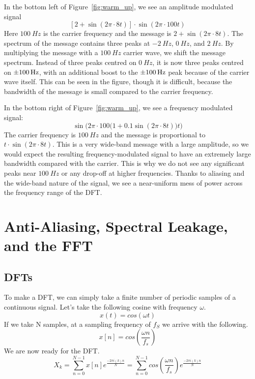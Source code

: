 \documentclass[twocolumn]{myarticle}
\begin{document}
In the bottom left of Figure~\ref{fig:warm_up}, we see an amplitude modulated signal
\[
    \left[ 2 + \sin(2\pi \cdot 8 t) \right] \cdot \sin ( 2 \pi \cdot 100 t)
\]
Here $ \SI{100}{Hz} $ is the carrier frequency and the message is $ 2 + \sin(2 \pi \cdot 8 t) $.
The spectrum of the message contains three peaks at $ \SI{-2}{Hz} $, $ \SI{0}{Hz} $, and $ \SI{2}{Hz} $.
By multiplying the message with a $ \SI{100}{Hz} $ carrier wave, we shift the message spectrum.
Instead of three peaks centred on $ \SI{0}{Hz} $, it is now three peaks centred on $ \SI{+-100}{Hz} $, with an additional boost to the $ \SI{+-100}{Hz} $ peak because of the carrier wave itself.
This can be seen in the figure, though it is difficult, because the bandwidth of the message is small compared to the carrier frequency.

In the bottom right of Figure~\ref{fig:warm_up}, we see a frequency modulated signal:
\[
    \sin \Big( 2 \pi \cdot 100 \big( 1 + 0.1 \sin (2 \pi \cdot 8 t) \big) t \Big)
\]
The carrier frequency is $ \SI{100}{Hz} $ and the message is proportional to $ t \cdot \sin(2 \pi \cdot 8 t) $.
This is a very wide-band message with a large amplitude, so we would expect the resulting frequency-modulated signal to have an extremely large bandwidth compared with the carrier.
This is why we do not see any significant peaks near $ \SI{100}{Hz} $ or any drop-off at higher frequencies.
Thanks to aliasing and the wide-band nature of the signal, we see a near-uniform mess of power across the frequency range of the DFT.

\section{Anti-Aliasing, Spectral Leakage, and the FFT}
\subsection{DFTs}
To make a DFT, we can simply take a finite number of periodic samples of a continuous signal. Let's take the following cosine with frequency $\omega$.
\begin{equation*}
x(t)=cos(\omega t)
\end{equation*}
If we take N samples, at a sampling frequency of $f_{S}$ we arrive with the following.
\begin{equation*}
x[n]=cos(\frac{\omega n}{f_{s}})
\end{equation*}
We are now ready for the DFT.
\begin{equation*}
X_{k} = \sum^{N-1}_{n=0}x[n]e^{\frac{-2\pi i(k)n}{N}} = \sum^{N-1}_{n=0}cos(\frac{\omega n}{f_{s}})e^{\frac{-2\pi i(k)n}{N}}
\end{equation*}
\end{document}
